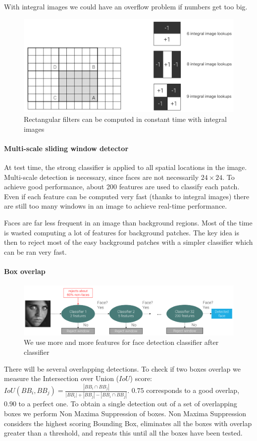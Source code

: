 \documentclass{article}
\begin{document}
With integral images we could have an overflow problem if numbers get too big.

\begin{figure}[htbp]
  \centering
  \includegraphics[width=0.6\linewidth]{./img/integral_filters.png}
  \caption{Rectangular filters can be computed in constant time with integral images}
\end{figure}

\paragraph{Multi-scale sliding window detector}
At test time, the strong classifier is applied to all spatial locations in the image.
Multi-scale detection is necessary, since faces are not necessarily $24\times 24$.
To achieve good performance, about 200 features are used to classify each patch.
Even if each feature can be computed very fast (thanks to integral images) there are still too many windows in an image to achieve real-time performance.

Faces are far less frequent in an image than background regions.
Most of the time is wasted computing a lot of features for background patches.
The key idea is then to reject most of the easy background patches with a simpler classifier which can be ran very fast.

\paragraph{Box overlap}

\begin{figure}[htbp]
  \centering
  \includegraphics[width=0.6\linewidth]{./img/cascade_classifier.png}
  \caption{We use more and more features for face detection classifier after classifier}
\end{figure}

There will be several overlapping detections.
To check if two boxes overlap we measure the Intersection over Union ($IoU$) score: $IoU(BB_i, BB_j) = \frac{|BB_i \cap BB_j|}{|BB_i| + |BB_j| - |BB_i \cap BB_j|}$. $0.75$ corresponds to a good overlap, $0.90$ to a perfect one.
To obtain a single detection out of a set of overlapping boxes we perform Non Maxima Suppression of boxes.
Non Maxima Suppression considers the highest scoring Bounding Box, eliminates all the boxes with overlap greater than a threshold, and repeats this until all the boxes have been tested.
\end{document}
